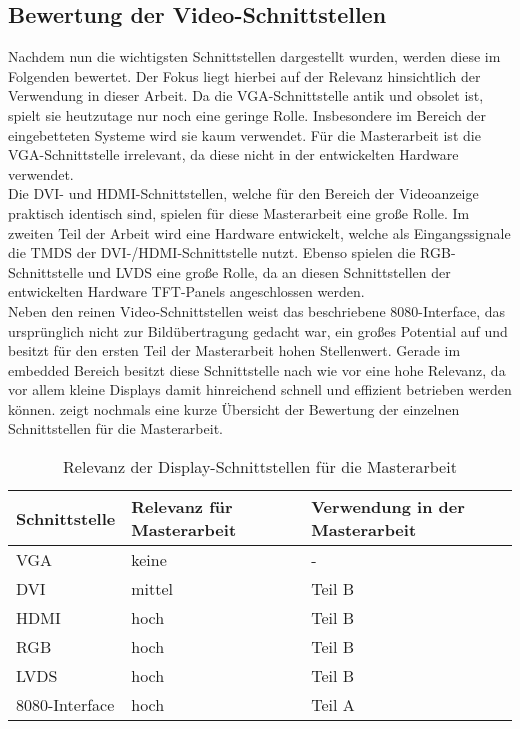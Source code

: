 \subsection{Bewertung der Video-Schnittstellen}
\label{cha:bewertung_video}
Nachdem nun die wichtigsten Schnittstellen dargestellt wurden, werden diese im Folgenden bewertet. Der Fokus liegt hierbei auf der Relevanz hinsichtlich der Verwendung in dieser Arbeit.
Da die VGA-Schnittstelle antik und obsolet ist, spielt sie heutzutage nur noch eine geringe Rolle. Insbesondere im Bereich der eingebetteten Systeme wird sie kaum verwendet. Für die Masterarbeit ist die VGA-Schnittstelle irrelevant, da diese nicht in der entwickelten Hardware verwendet.\\
Die DVI- und HDMI-Schnittstellen, welche für den Bereich der Videoanzeige praktisch identisch sind, spielen für diese Masterarbeit eine große Rolle. Im zweiten Teil der Arbeit wird eine Hardware entwickelt, welche als Eingangssignale die TMDS der DVI-/HDMI-Schnittstelle nutzt. 
Ebenso spielen die RGB-Schnittstelle und LVDS eine große Rolle, da an diesen Schnittstellen der entwickelten Hardware TFT-Panels angeschlossen werden. \\
Neben den reinen Video-Schnittstellen weist das beschriebene 8080-Interface, das ursprünglich nicht zur Bildübertragung gedacht war, ein großes Potential auf und besitzt für den ersten Teil der Masterarbeit hohen Stellenwert. Gerade im embedded Bereich besitzt diese Schnittstelle nach wie vor eine hohe Relevanz, da vor allem kleine Displays damit hinreichend schnell und effizient betrieben werden können.  zeigt nochmals eine kurze Übersicht der Bewertung der einzelnen Schnittstellen für die Masterarbeit.

\begin{table}[h]
\begin{tabular}{|p{3cm}|p{5cm}|p{4.5cm}|}\hline
\rowcolor{TableBackgroundColor}
   \textbf{Schnittstelle} 	& \textbf{Relevanz für Masterarbeit} 	& \textbf{Verwendung in der Masterarbeit}	\\ \hline
   VGA 						& keine  								& - 	 									\\ \hline
   DVI 						& mittel 								& Teil B 									\\ \hline
   HDMI						& hoch 									& Teil B 									\\ \hline
   RGB 						& hoch 									& Teil B 									\\ \hline
   LVDS 					& hoch									& Teil B 									\\ \hline
   8080-Interface 			& hoch 									& Teil A 									\\ \hline
\end{tabular}
\caption{Relevanz der Display-Schnittstellen für die Masterarbeit}
\label{tab:interface_vergleich}
\end{table}

